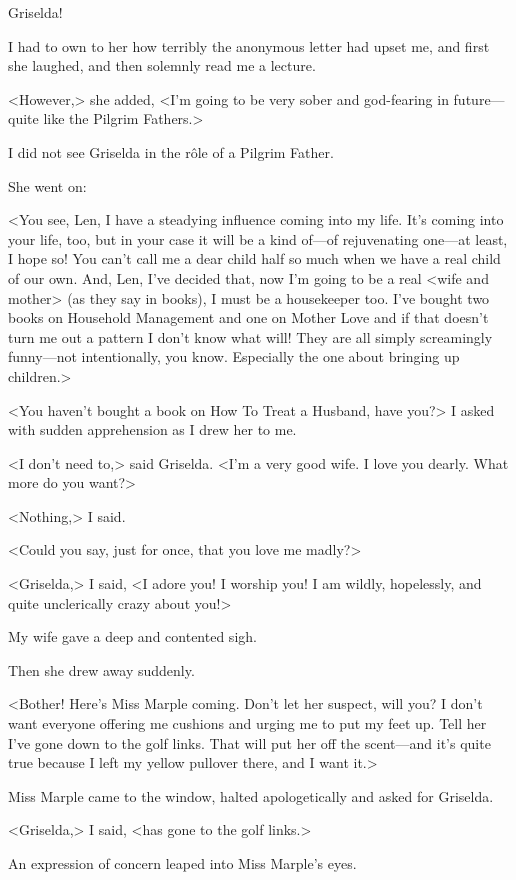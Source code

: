 Griselda!

I had to own to her how terribly the anonymous letter had upset me, and first she laughed, and then solemnly read me a lecture.

<However,> she added, <I'm going to be very sober and god-fearing in future—quite like the Pilgrim Fathers.>

I did not see Griselda in the rôle of a Pilgrim Father.

She went on:

<You see, Len, I have a steadying influence coming into my life. It's coming into your life, too, but in your case it will be a kind of—of rejuvenating one—at least, I hope so! You can't call me a dear child half so much when we have a real child of our own. And, Len, I've decided that, now I'm going to be a real <wife and mother> (as they say in books), I must be a housekeeper too. I've bought two books on Household Management and one on Mother Love and if that doesn't turn me out a pattern I don't know what will! They are all simply screamingly funny—not intentionally, you know. Especially the one about bringing up children.>

<You haven't bought a book on How To Treat a Husband, have you?> I asked with sudden apprehension as I drew her to me.

<I don't need to,> said Griselda. <I'm a very good wife. I love you dearly. What more do you want?>

<Nothing,> I said.

<Could you say, just for once, that you love me madly?>

<Griselda,> I said, <I adore you! I worship you! I am wildly, hopelessly, and quite unclerically crazy about you!>

My wife gave a deep and contented sigh.

Then she drew away suddenly.

<Bother! Here's Miss Marple coming. Don't let her suspect, will you? I don't want everyone offering me cushions and urging me to put my feet up. Tell her I've gone down to the golf links. That will put her off the scent—and it's quite true because I left my yellow pullover there, and I want it.>

Miss Marple came to the window, halted apologetically and asked for Griselda.

<Griselda,> I said, <has gone to the golf links.>

An expression of concern leaped into Miss Marple's eyes.

